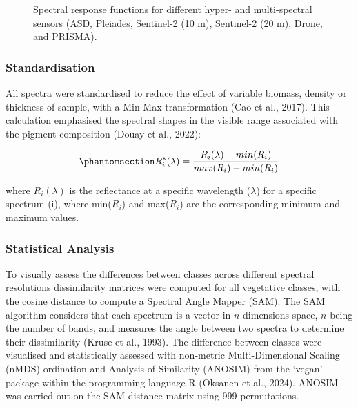 \documentclass[
  letterpaper,
  11pt,
  english,
  singlespacing,
  headsepline]{MastersDoctoralThesis}
\begin{document}
\begin{spacing}{1.5}
\begin{figure}
{}

\caption{\label{fig-SpectraDegFIG}Spectral response functions for
different hyper- and multi-spectral sensors (ASD, Pleiades, Sentinel-2
(10 m), Sentinel-2 (20 m), Drone, and PRISMA).}

\end{figure}%

\subsubsection{Standardisation}\label{standardisation}

All spectra were standardised to reduce the effect of variable biomass,
density or thickness of sample, with a Min-Max transformation (Cao et
al., 2017). This calculation emphasised the spectral shapes in the
visible range associated with the pigment composition (Douay et al.,
2022):

\begin{equation}\phantomsection\label{eq-stdspectra}{ R_{i}^*(\lambda) = \frac{R_{i}(\lambda)-min(R_{i}) }{max(R_{i})-min(R_{i}) }}\end{equation}

where \(R_{i}(\lambda)\) is the reflectance at a specific wavelength
(\(\lambda\)) for a specific spectrum (i), where min(\(R_{i}\)) and
max(\(R_{i}\)) are the corresponding minimum and maximum values.

\subsubsection{Statistical Analysis}\label{statistical-analysis}

To visually assess the differences between classes across different
spectral resolutions dissimilarity matrices were computed for all
vegetative classes, with the cosine distance to compute a Spectral Angle
Mapper (SAM). The SAM algorithm considers that each spectrum is a vector
in \(n\)-dimensions space, \(n\) being the number of bands, and measures
the angle between two spectra to determine their dissimilarity (Kruse et
al., 1993). The difference between classes were visualised and
statistically assessed with non-metric Multi-Dimensional Scaling (nMDS)
ordination and Analysis of Similarity (ANOSIM) from the `vegan' package
within the programming language R (Oksanen et al., 2024). ANOSIM was
carried out on the SAM distance matrix using 999 permutations.


\end{spacing}
\end{document}
